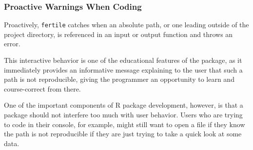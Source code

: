 \documentclass[12pt,twoside]{reedthesis}
\begin{document}
\hypertarget{proactive-warnings-when-coding}{%
\subsubsection{Proactive Warnings When Coding}\label{proactive-warnings-when-coding}}

Proactively, \texttt{fertile} catches when an absolute path, or one leading outside of the project directory, is referenced in an input or output function and throws an error.

This interactive behavior is one of the educational features of the package, as it immediately provides an informative message explaining to the user that such a path is not reproducible, giving the programmer an opportunity to learn and course-correct from there.

One of the important components of R package development, however, is that a package should not interfere too much with user behavior. Users who are trying to code in their console, for example, might still want to open a file if they know the path is not reproducible if they are just trying to take a quick look at some data.
\end{document}
